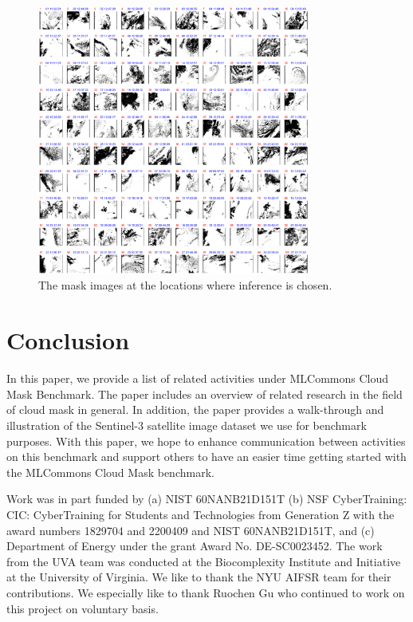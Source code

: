 \documentclass[sigplan,screen]{acmart}
\begin{document}
\begin{figure}[htb]
\centering\includegraphics[width=0.8\textwidth]{images/masks-output.png}
\caption{The mask images at the locations where inference is chosen.}
\label{fig:frames-mask}
\end{figure}



\section{Conclusion}


In this paper, we provide a list of related activities under MLCommons Cloud Mask Benchmark. The paper includes an overview of related research in the field of cloud mask in general. In addition, the paper provides a walk-through and illustration of the Sentinel-3 satellite image dataset we use for benchmark purposes. With this paper, we hope to enhance communication between activities on this benchmark and support others to have an easier time getting started with the MLCommons Cloud Mask benchmark.

\begin{acks}

Work was in part funded by (a) NIST 60NANB21D151T  (b) NSF CyberTraining: CIC: CyberTraining for Students and Technologies from Generation Z with the award numbers 1829704 and 2200409 and NIST 60NANB21D151T, and (c) Department of Energy under the grant Award No. DE-SC0023452. The work from the UVA team was conducted at the Biocomplexity Institute and Initiative at the University of Virginia.
We like to thank the NYU AIFSR team for their contributions. We especially like to thank Ruochen Gu who continued to work on this project on voluntary basis.


\end{acks}
\end{document}

